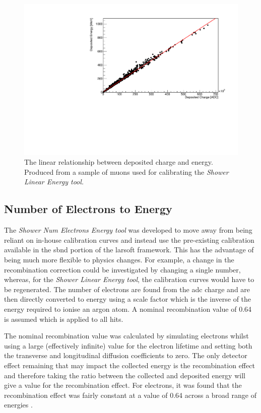 \begin{figure}[h!]
    \centering
    \includegraphics[width = \largefigwidth]{figures-chap4/linear_tool_lookup_curve.pdf}
    \caption{The linear relationship between deposited charge and energy. Produced from a sample of muons used for calibrating the \textit{Shower Linear Energy tool.}}
    \label{fig:linear lookup curve}
\end{figure}

\newpage

\subsection{Number of Electrons to Energy}\label{subchap:kGeVToElectrons}
The \textit{Shower Num Electrons Energy tool} was developed to move away from being reliant on in-house calibration curves and instead use the pre-existing calibration available in the \Gls{sbnd} portion of the \Gls{larsoft} framework. This has the advantage of being much more flexible to physics changes. For example, a change in the recombination correction could be investigated by changing a single number, whereas, for the \textit{Shower Linear Energy tool}, the calibration curves would have to be regenerated. The number of electrons are found from the \gls{adc} charge and are then directly converted to energy using a scale factor which is the inverse of the energy required to ionise an argon atom. A nominal recombination value of 0.64 is assumed which is applied to all hits.

The nominal recombination value was calculated by simulating electrons whilst using a large (effectively infinite) value for the electron lifetime and setting both the transverse and longitudinal diffusion coefficients to zero. The only detector effect remaining that may impact the collected energy is the recombination effect and therefore taking the ratio between the collected and deposited energy will give a value for the recombination effect. For electrons, it was found that the recombination effect was fairly constant at a value of 0.64 across a broad range of energies \cite{recombination_0.64}. 

